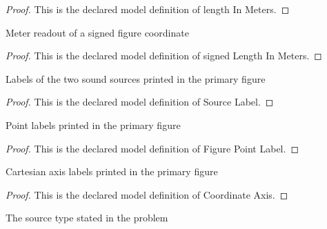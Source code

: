 \begin{proof}
  This is the declared model definition of length In Meters.
\end{proof}
\begin{definition}
  \label{def:physics:phyx-mini-0316:phyxminiproblems-problemphyxmini0316-signedlengthinmeters}
  Meter readout of a signed figure coordinate
\end{definition}
\begin{proof}
  This is the declared model definition of signed Length In Meters.
\end{proof}
\begin{definition}
  \label{def:physics:phyx-mini-0316:phyxminiproblems-problemphyxmini0316-sourcelabel}
  Labels of the two sound sources printed in the primary figure
\end{definition}
\begin{proof}
  This is the declared model definition of Source Label.
\end{proof}
\begin{definition}
  \label{def:physics:phyx-mini-0316:phyxminiproblems-problemphyxmini0316-figurepointlabel}
  Point labels printed in the primary figure
\end{definition}
\begin{proof}
  This is the declared model definition of Figure Point Label.
\end{proof}
\begin{definition}
  \label{def:physics:phyx-mini-0316:phyxminiproblems-problemphyxmini0316-coordinateaxis}
  Cartesian axis labels printed in the primary figure
\end{definition}
\begin{proof}
  This is the declared model definition of Coordinate Axis.
\end{proof}
\begin{definition}
  \label{def:physics:phyx-mini-0316:phyxminiproblems-problemphyxmini0316-acousticsourcekind}
  The source type stated in the problem
\end{definition}
